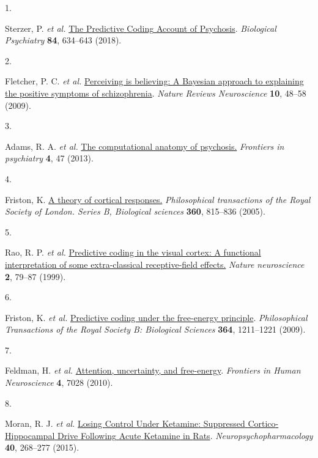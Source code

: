 \documentclass[
]{article}
\newlength{\cslhangindent}
\newlength{\csllabelwidth}
\newenvironment{CSLReferences}[2] %
 {\begin{list}{}{%
  \setlength{\itemindent}{0pt}
  \setlength{\leftmargin}{0pt}
  \setlength{\parsep}{0pt}
  \ifodd #1
   \setlength{\leftmargin}{\cslhangindent}
   \setlength{\itemindent}{-1\cslhangindent}
  \fi
  \setlength{\itemsep}{#2\baselineskip}}}
 {\end{list}}
\newcommand{\CSLLeftMargin}[1]{\parbox[t]{\csllabelwidth}{\strut#1\strut}}
\newcommand{\CSLRightInline}[1]{\parbox[t]{\linewidth - \csllabelwidth}{\strut#1\strut}}
\begin{document}
\label{refs}
\begin{CSLReferences}{0}{0}
\CSLLeftMargin{1. }%
\CSLRightInline{Sterzer, P. \emph{et al.}
\href{https://doi.org/10.1016/j.biopsych.2018.05.015}{The {Predictive}
{Coding} {Account} of {Psychosis}}. \emph{Biological Psychiatry}
\textbf{84}, 634--643 (2018).}

\CSLLeftMargin{2. }%
\CSLRightInline{Fletcher, P. C. \emph{et al.}
\href{https://doi.org/10.1038/nrn2536}{Perceiving is believing: A
{Bayesian} approach to explaining the positive symptoms of
schizophrenia}. \emph{Nature Reviews Neuroscience} \textbf{10}, 48--58
(2009).}

\CSLLeftMargin{3. }%
\CSLRightInline{Adams, R. A. \emph{et al.}
\href{https://doi.org/10.3389/fpsyt.2013.00047}{The computational
anatomy of psychosis.} \emph{Frontiers in psychiatry} \textbf{4}, 47
(2013).}

\CSLLeftMargin{4. }%
\CSLRightInline{Friston, K.
\href{https://doi.org/10.1098/rstb.2005.1622}{A theory of cortical
responses.} \emph{Philosophical transactions of the Royal Society of
London. Series B, Biological sciences} \textbf{360}, 815--836 (2005).}

\CSLLeftMargin{5. }%
\CSLRightInline{Rao, R. P. \emph{et al.}
\href{https://doi.org/10.1038/4580}{Predictive coding in the visual
cortex: A functional interpretation of some extra-classical
receptive-field effects.} \emph{Nature neuroscience} \textbf{2}, 79--87
(1999).}

\CSLLeftMargin{6. }%
\CSLRightInline{Friston, K. \emph{et al.}
\href{https://doi.org/10.1098/rstb.2008.0300}{Predictive coding under
the free-energy principle}. \emph{Philosophical Transactions of the
Royal Society B: Biological Sciences} \textbf{364}, 1211--1221 (2009).}

\CSLLeftMargin{7. }%
\CSLRightInline{Feldman, H. \emph{et al.}
\href{https://doi.org/10.3389/FNHUM.2010.00215/BIBTEX}{Attention,
uncertainty, and free-energy}. \emph{Frontiers in Human Neuroscience}
\textbf{4}, 7028 (2010).}

\CSLLeftMargin{8. }%
\CSLRightInline{Moran, R. J. \emph{et al.}
\href{https://doi.org/10.1038/npp.2014.184}{Losing {Control} {Under}
{Ketamine}: {Suppressed} {Cortico}-{Hippocampal} {Drive} {Following}
{Acute} {Ketamine} in {Rats}}. \emph{Neuropsychopharmacology}
\textbf{40}, 268--277 (2015).}


\end{CSLReferences}
\end{document}
